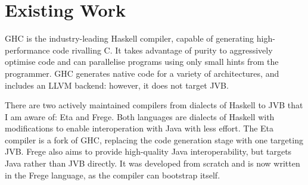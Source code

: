 \documentclass[dissertation.tex]{subfiles}
\begin{document}
\section{Existing Work}
{
    GHC is the industry-leading Haskell compiler, capable of generating high-performance code rivalling C. It takes advantage of purity to aggressively optimise code and can parallelise programs using only small hints from the programmer. GHC generates native code for a variety of architectures, and includes an LLVM backend: however, it does not target JVB.

    There are two actively maintained compilers from dialects of Haskell to JVB that I am aware of: Eta and Frege. Both languages are dialects of Haskell with modifications to enable interoperation with Java with less effort. The Eta compiler is a fork of GHC, replacing the code generation stage with one targeting JVB. Frege also aims to provide high-quality Java interoperability, but targets Java rather than JVB directly. It was developed from scratch and is now written in the Frege language, as the compiler can bootstrap itself. 
}
\end{document}
